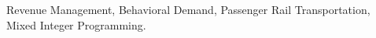 

\vspace{0.5cm}

 Revenue Management, Behavioral Demand, Passenger Rail Transportation, Mixed Integer Programming.

